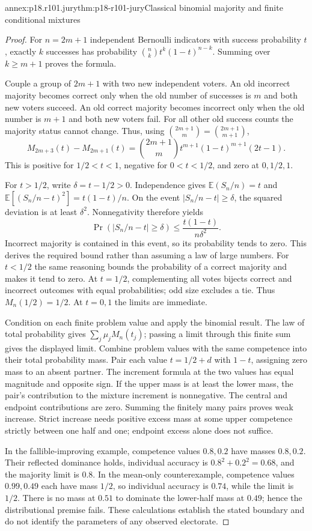 \begin{annexitem}{annex:p18.r101.jury}{thm:p18-r101-jury}{Classical binomial majority and finite conditional mixtures}
\begin{proof}
For \(n=2m+1\) independent Bernoulli indicators with success
probability \(t\), exactly \(k\) successes has probability
\({n\choose k}t^k(1-t)^{n-k}\). Summing over \(k\geq m+1\)
proves the formula.

Couple a group of \(2m+1\) with two new independent voters. An old
incorrect majority becomes correct only when the old number of successes
is \(m\) and both new voters succeed. An old correct majority becomes
incorrect only when the old number is \(m+1\) and both new voters fail.
For all other old success counts the majority status cannot change.
Thus, using \({2m+1\choose m}={2m+1\choose m+1}\),
\[
 M_{2m+3}(t)-M_{2m+1}(t)
 ={2m+1\choose m}t^{m+1}(1-t)^{m+1}(2t-1).
\]
This is positive for \(1/2<t<1\), negative for \(0<t<1/2\),
and zero at \(0,1/2,1\).

For \(t>1/2\), write \(\delta=t-1/2>0\). Independence gives
\(\mathbb E(S_n/n)=t\) and
\(\mathbb E[(S_n/n-t)^2]=t(1-t)/n\). On the event
\(|S_n/n-t|\geq\delta\), the squared deviation is at least
\(\delta^2\). Nonnegativity therefore yields
\[
 \Pr(|S_n/n-t|\geq\delta)
 \leq \frac{t(1-t)}{n\delta^2}.
\]
Incorrect majority is contained in this event, so its probability tends
to zero. This derives the required bound rather than assuming a law of
large numbers. For \(t<1/2\) the same reasoning bounds the probability
of a correct majority and makes it tend to zero. At \(t=1/2\),
complementing all votes bijects correct and incorrect outcomes with equal
probabilities; odd size excludes a tie. Thus \(M_n(1/2)=1/2\).
At \(t=0,1\) the limits are immediate.

Condition on each finite problem value and apply the binomial result.
The law of total probability gives
\(\sum_j\mu_jM_n(t_j)\); passing a limit through this finite sum
gives the displayed limit. Combine problem values with the same
competence into their total probability mass. Pair each value
\(t=1/2+d\) with \(1-t\), assigning zero mass to an absent partner.
The increment formula at the two values has equal magnitude and
opposite sign. If the upper mass is at least the lower mass, the
pair's contribution to the mixture increment is nonnegative. The
central and endpoint contributions are zero. Summing the finitely many
pairs proves weak increase. Strict increase needs positive excess mass
at some upper competence strictly between one half and one; endpoint
excess alone does not suffice.

In the fallible-improving example, competence values \(0.8,0.2\)
have masses \(0.8,0.2\). Their reflected dominance holds, individual
accuracy is \(0.8^2+0.2^2=0.68\), and the majority limit is \(0.8\).
In the mean-only counterexample, competence values \(0.99,0.49\)
each have mass \(1/2\), so individual accuracy is \(0.74\), while
the limit is \(1/2\). There is no mass at \(0.51\) to dominate
the lower-half mass at \(0.49\); hence the distributional premise
fails. These calculations establish the stated boundary and do not
identify the parameters of any observed electorate.
\end{proof}
\end{annexitem}
